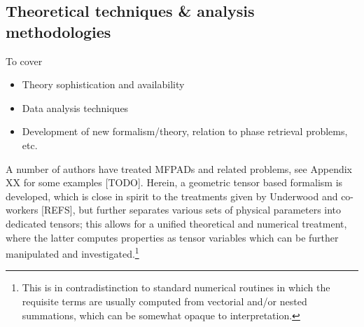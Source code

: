 \subsection{Theoretical techniques \& analysis methodologies}

To cover 

\begin{itemize}
\item Theory sophistication and availability
\item Data analysis techniques
\item Development of new formalism/theory, relation to phase retrieval problems, etc.
\end{itemize}

A number of authors have treated MFPADs and related problems, see Appendix XX for some examples [TODO]. Herein, a geometric tensor based formalism is developed, which is close in spirit to the treatments given by Underwood and co-workers [REFS], but further separates various sets of physical parameters into dedicated tensors; this allows for a unified theoretical and numerical treatment, where the latter computes properties as tensor variables which can be further manipulated and investigated.\footnote{This is in contradistinction to standard numerical routines in which the requisite terms are usually computed from vectorial and/or nested summations, which can be somewhat opaque to interpretation.}